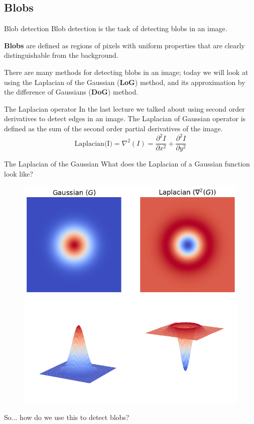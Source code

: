 \documentclass[9pt, aspectratio=169]{beamer}
\begin{document}
\subsection{Blobs}

\begin{frame}
    {Blob detection}
    Blob detection is the task of detecting blobs in an image.

    \textbf{Blobs} are defined as regions of pixels with uniform properties that are clearly distinguishable from the background.

    There are many methods for detecting blobs in an image; today we will look at using the Laplacian of the Gaussian (\textbf{LoG}) method, and its approximation by the difference of Gaussians (\textbf{DoG}) method.
\end{frame}

\begin{frame}
    {The Laplacian operator}
    In the last lecture we talked about using second order derivatives to detect edges in an image.
    The Laplacian of Gaussian operator is defined as the sum of the second order partial derivatives of the image.
    \large{
    $$\text{Laplacian(I)} = \nabla^2(I) = \frac{\partial^2{I}}{\partial{x^2}} + \frac{\partial^2{I}}{\partial{y^2}}$$
    }
\end{frame}

\begin{frame}
    {The Laplacian of the Gaussian}
    \centering
    What does the Laplacian of a Gaussian function look like?

    \begin{figure}
        \centering
        \includegraphics[width=.45\textwidth]{gaussian_and_laplacian_2D.png}
        \includegraphics[width=.45\textwidth]{gaussian_and_laplacian_3D.png}
    \end{figure}
    \centering
    So... how do we use this to detect blobs?
\end{frame}
\end{document}
